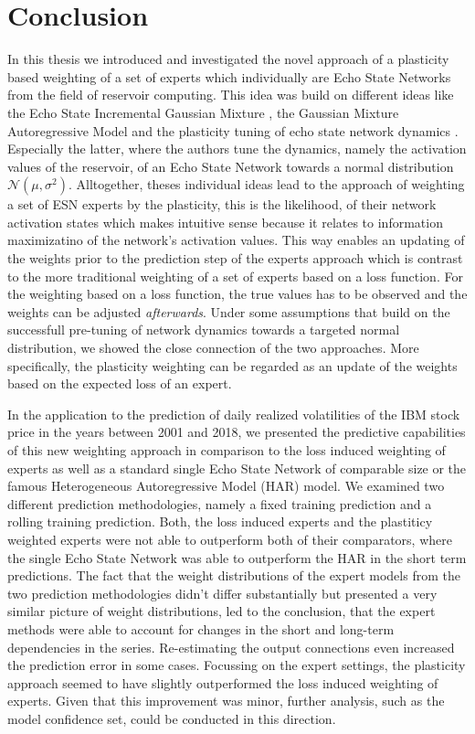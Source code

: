 \section{Conclusion}
\label{CH:Conclusion}

In this thesis we introduced and investigated the novel approach of a plasticity based weighting of a set of experts which individually are Echo State Networks from the field of reservoir computing. This idea was build on different ideas like the Echo State Incremental Gaussian Mixture \citep{Engel2010IncrementalGaussianMixtures, Heinen2011IGMN, Heinen2011ACA,ESIGM2011}, the Gaussian Mixture Autoregressive Model \citep{Kalliovirta2015GMUnivariateSeries} and the plasticity tuning of echo state network dynamics \citep{Schrauwen2008}. Especially the latter, where the authors tune the dynamics, namely the activation values of the reservoir, of an Echo State Network towards a normal distribution $\mathcal{N}(\mu, \sigma^2)$. Alltogether, theses individual ideas lead to the approach of weighting a set of ESN experts by the plasticity, this is the likelihood, of their network activation states which makes intuitive sense because it relates to information maximizatino of the network's activation values. This way enables an updating of the weights prior to the prediction step of the experts approach which is contrast to the more traditional weighting of a set of experts based on a loss function. For the weighting based on a loss function, the true values has to be observed and the weights can be adjusted \textit{afterwards}. Under some assumptions that build on the successfull pre-tuning of network dynamics towards a targeted normal distribution, we showed the close connection of the two approaches. More specifically, the plasticity weighting can be regarded as an update of the weights based on the expected loss of an expert.

In the application to the prediction of daily realized volatilities of the IBM stock price in the years between 2001 and 2018, we presented the predictive capabilities of this new weighting approach in comparison to the loss induced weighting of experts as well as a standard single Echo State Network of comparable size or the famous Heterogeneous Autoregressive Model (HAR) model. We examined two different prediction methodologies, namely a fixed training prediction and a rolling training prediction. Both, the loss induced experts and the plastiticy weighted experts were not able to outperform both of their comparators, where the single Echo State Network was able to outperform the HAR in the short term predictions.  The fact that the weight distributions of the expert models from the two prediction methodologies didn't differ substantially but presented a very similar picture of weight distributions, led to the conclusion, that the expert methods were able to account for changes in the short and long-term dependencies in the series. Re-estimating the output connections even increased the prediction error in some cases. Focussing on the expert settings, the plasticity approach seemed to have slightly outperformed the loss induced weighting of experts. Given that this improvement was minor, further analysis, such as the model confidence set, could be conducted in this direction.

